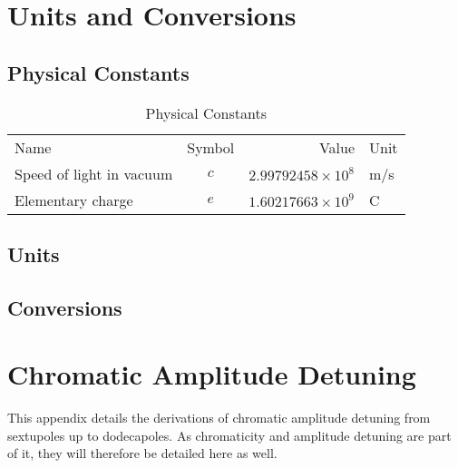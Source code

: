\appendix  %
\chapter{Units and Conversions}
\thumbforappendix


\section{Physical Constants}

\begin{table}[H]
    \centering
    \begin{tabular}{lcrl}
    Name                        &    Symbol     &    Value                        &     Unit      \\
    Speed of light in vacuum    &     $c$       &   $2.99792458 \times 10^8$      &      m/s      \\
    Elementary charge           &     $e$       &   $1.60217663 \times 10^9$      &       C       \\
        
    \end{tabular}
    \caption{Physical Constants}
    \label{table:appendix:physical_constants}
\end{table}


\section{Units}



\section{Conversions}




\chapter{Chromatic Amplitude Detuning}
\label{chromatic-amplitude-detuning}

This appendix details the derivations of chromatic amplitude detuning from sextupoles up to
dodecapoles. As chromaticity and amplitude detuning are part of it, they will therefore be detailed
here as well.

